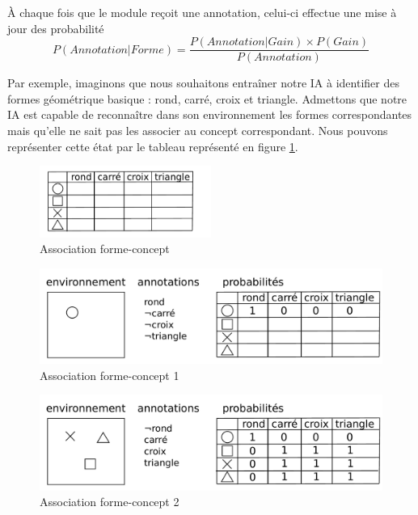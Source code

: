 


À chaque fois que le module reçoit une annotation, celui-ci effectue une mise à jour des probabilité
\[ P(Annotation|Forme) = \frac{P(Annotation|Gain) \times P(Gain)}{P(Annotation)} \]

Par exemple, imaginons que nous souhaitons entraîner notre IA à identifier des formes géométrique basique : rond, carré, croix et triangle. Admettons que notre IA est capable de reconnaître dans son environnement les formes correspondantes mais qu'elle ne sait pas les associer au concept correspondant. Nous pouvons représenter cette état par le tableau représenté en figure \ref{img_annotations}.

\begin{figure}[H] 
  \begin{center}
    \includegraphics[width=0.5\textwidth]{files/raisonneur/annotations} 
  \end{center}
\caption{Association forme-concept} 
\label{img_annotations}
\end{figure}

\begin{figure}[H] 
\includegraphics[width=\textwidth]{files/raisonneur/annotations_1} 
\caption{Association forme-concept 1} 
\label{img_annotations_1}
\end{figure}

\begin{figure}[H] 
\includegraphics[width=\textwidth]{files/raisonneur/annotations_2} 
\caption{Association forme-concept 2} 
\label{img_annotations_2}
\end{figure}

